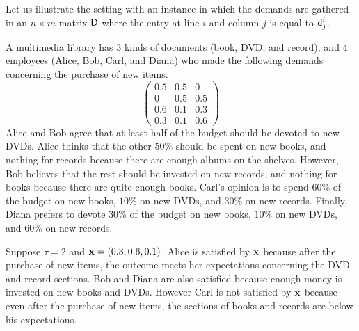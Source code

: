 \documentclass{article}
\begin{document}








Let us illustrate the setting with an instance in which the demands are gathered in an $n \times m$ matrix ${\sf D}$ where the entry at line $i$ and column $j$ is equal to ${\sf d}^i_j$.
\begin{instance} \label{instance_nocover} A multimedia library has 3 kinds of documents (book, DVD, and record), and   
4 employees (Alice, Bob, Carl, and Diana) who made the following demands concerning the purchase of new items. 
$$\left( \begin{array}{ccc}
0.5 & 0.5 & 0 \\
0 & 0.5 & 0.5 \\
0.6 & 0.1 & 0.3 \\
0.3 & 0.1 & 0.6 
\end{array} \right)$$
Alice and Bob agree that at least half of the budget should be devoted to new DVDs. Alice thinks that the other $50\%$ should be spent on new books, and nothing for records because there are enough albums on the shelves. However, Bob believes that the rest should be invested on new records, and nothing for books because there are quite enough books. Carl's opinion is to spend $60\%$ of the budget on new books, $10\%$ on new DVDs, and $30\%$ on new records. Finally, Diana prefers to devote $30\%$ of the budget on new books, $10\%$ on new DVDs, and $60\%$ on new records.   

Suppose $\tau=2$ and ${\bf x}=(0.3,0.6,0.1)$. Alice is satisfied by ${\bf x}$ because after the purchase of new items, the outcome meets her expectations concerning the DVD and record sections. Bob and Diana are also satisfied because enough money is invested on new books and DVDs. However Carl is not satisfied by ${\bf x}$ because even after the purchase of new items, the sections of books and records are below his expectations.
\end{instance}


\end{document}
